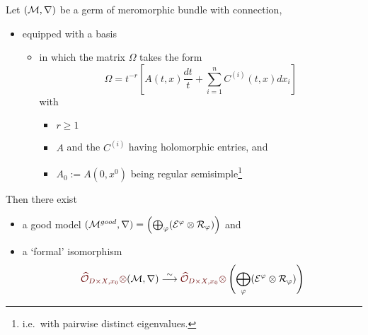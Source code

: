 \begin{thm}
  Let $(\mathcal{M},\nabla)$ be a germ of meromorphic bundle with connection,
  \begin{itemize}
    \item equipped with a basis
      \begin{itemize}
        \item
          in which the matrix $\Omega$ takes the form
          \[
            \Omega=t^{-r}\left[A(t,x)\frac{dt}{t}
              +\sum_{i=1}^nC^{(i)}(t,x)dx_i\right]
          \]
        with
        \begin{itemize}
          \item $r\geq1$
          \item $A$ and the $C^{(i)}$ having holomorphic entries, and
          \item $A_0:=A(0,x^0)$ being regular semisimple\footnote{i.e.\ with
            pairwise distinct eigenvalues.}
        \end{itemize}
      \end{itemize}
  \end{itemize}
  Then there exist
  \begin{itemize}
    \item a good model $(\mathcal{M}^{good},\nabla)
      =\left(\bigoplus_\varphi(\mathcal{E}^\varphi\otimes\mathcal{R}_\varphi) \right)$ and
    \item a \textcolor{red!40!black}{`formal'} isomorphism
      \[
        \textcolor{red!40!black}{\hat\cO_{D\times X,x_0}\otimes}(\cM,\nabla)
        \overset{\sim}{\longrightarrow}
      \textcolor{red!40!black}{\hat\cO_{D\times X,x_0}\otimes}
        \left(\bigoplus_\phi(\cE^\phi\otimes\cR_\phi) \right)
      \]
  \end{itemize}
\end{thm}
\begin{comment}
  \begin{rem}
    \begin{itemize}
      \item In the present situation, no ramification is needed.
        \TODO[Why?]
      \item Moreover, we will see that all the components $\cR^\phi$ occurring
        in the model have rank one, which is not the case in general, even when
        no ramification is needed.
    \end{itemize}
  \end{rem}
\end{comment}

